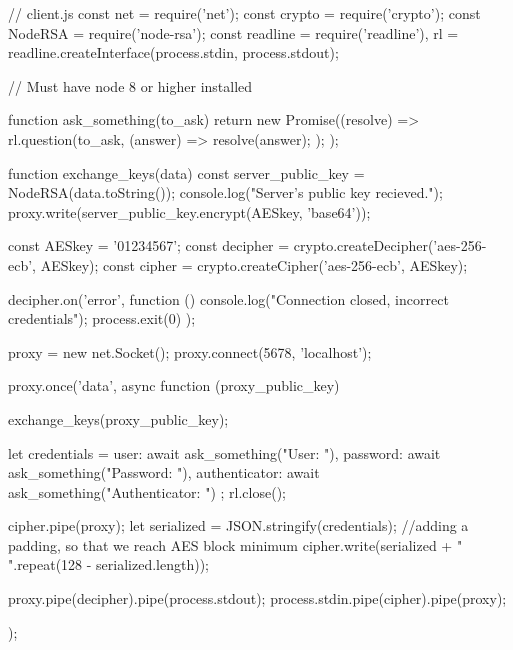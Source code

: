
\begin{js}
// client.js
const net = require('net');
const crypto = require('crypto');
const NodeRSA = require('node-rsa');
const readline = require('readline'), rl = readline.createInterface(process.stdin, process.stdout);

// Must have node 8 or higher installed


function ask_something(to_ask) {
    return new Promise((resolve) => {
        rl.question(to_ask, (answer) => {
            resolve(answer);
        });
    });
}


function exchange_keys(data) {
    const server_public_key = NodeRSA(data.toString());
    console.log("Server's public key recieved.");
    proxy.write(server_public_key.encrypt(AESkey, 'base64'));
}

const AESkey = '01234567';
const decipher = crypto.createDecipher('aes-256-ecb', AESkey);
const cipher = crypto.createCipher('aes-256-ecb', AESkey);

decipher.on('error', function () {
    console.log("Connection closed, incorrect credentials");
    process.exit(0)
});

proxy = new net.Socket();
proxy.connect(5678, 'localhost');

proxy.once('data', async function (proxy_public_key) {
    exchange_keys(proxy_public_key);

    let credentials = {
        user: await ask_something("User: "),
        password: await ask_something("Password: "),
        authenticator: await ask_something("Authenticator: ")
    };
    rl.close();

    cipher.pipe(proxy);
    let serialized = JSON.stringify(credentials);
    //adding a padding, so that we reach AES block minimum
    cipher.write(serialized + " ".repeat(128 - serialized.length));

    proxy.pipe(decipher).pipe(process.stdout);
    process.stdin.pipe(cipher).pipe(proxy);

});
\end{js}



